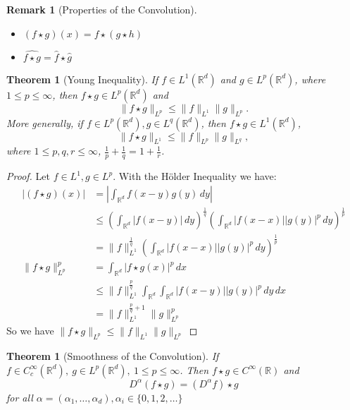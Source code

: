 \documentclass{report}
\theoremstyle{tommy}
\newtheorem{thm}[defn]{Theorem}
\newtheorem{rem}[defn]{Remark}
\begin{document}
  \begin{rem}[Properties of the Convolution]\
    \begin{itemize}
      \item \((f \star g)(x) = f \star (g \star h)\)
      \item \(\widehat{f \star g} = \hat f \star \hat g\)
    \end{itemize}
  \end{rem}


  \begin{thm}[Young Inequality]
    If \(f \in L^1(\mathbb{R}^d)\) and \(g \in L^p(\mathbb{R}^d)\), where \(1 \le p \le \infty\), then \(f \star g \in L^p(\mathbb{R}^d)\) and \[\|f \star g \|_{L^p} \le \|f\|_{L^1} \|g\|_{L^p}.\] More generally, if \(f \in L^p(\mathbb{R}^d), g \in L^q(\mathbb{R}^d)\), then \(f \star g \in L^1(\mathbb{R}^d)\), \[\| f \star g\|_{L^1} \le \|f\|_{L^p} \|g\|_{L^q},\]where \(1 \le p, q, r \le \infty\), \(\frac{1}{p} + \frac{1}{q} = 1 + \frac{1}{r}\).
  \end{thm}

  \begin{proof}
    Let \(f \in L^1, g \in L^p\). With the Hölder Inequality we have:
    \begin{align*}
      |(f \star g)(x)| 
      &= \left| \int_{\mathbb{R}^d} f(x-y)g(y) \, dy \right| \\
      &\le \left(\int_{\mathbb{R}^d} |f(x-y)| \, dy\right)^{\frac{1}{q}} \left(\int_{\mathbb{R}^d} |f(x-x)| |g(y)|^p \, dy \right)^{\frac{1}{p}} \\
      &= \| f \|_{L^1}^{\frac{1}{q}} \left(\int_{\mathbb{R}^d} |f(x-x)| |g(y)|^p \, dy \right)^{\frac{1}{p}} \\
      \|f \star g\|_{L^p}^p
      &= \int_{\mathbb{R}^d} |f \star g(x)|^p \, dx \\
      &\le \|f\|_{L^1}^{\frac{p}{q}} \int_{\mathbb{R}^d} \int_{\mathbb{R}^d} |f(x-y)||g(y)|^p \, dy \, dx \\
      &= \| f \|_{L^1}^{\frac{p}{q} + 1} \|g\|_{L^p}^p
    \end{align*}
    So we have \(\| f \star g \|_{L^p} \le \|f\|_{L^1} \|g\|_{L^p}\)
  \end{proof}

  \begin{thm}[Smoothness of the Convolution]
    If \(f \in C_c^\infty(\mathbb{R}^d),\ g \in L^p(\mathbb{R}^d),\ 1 \le p \le \infty\). Then \(f \star g \in C^\infty(\mathbb{R})\) and 
    \[D^\alpha (f\star g) = (D^\alpha f) \star g\]
    for all \(\alpha = (\alpha_1, \dots, \alpha_d), \alpha_i \in \{0, 1, 2, \dots\}\)
  \end{thm}
\end{document}
